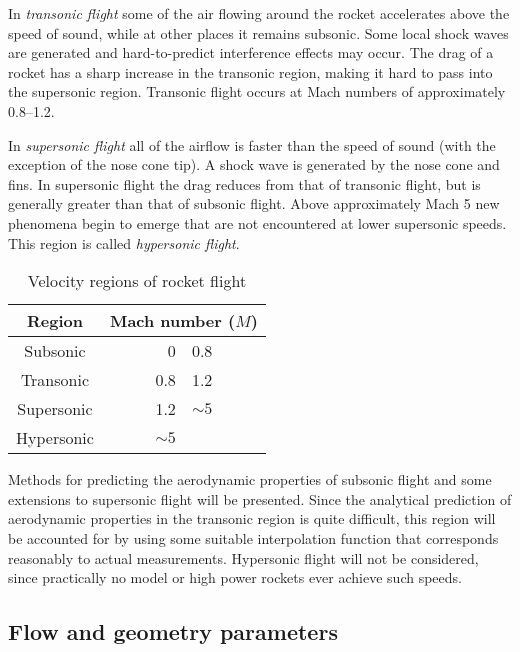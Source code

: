 In {\it transonic flight} some of the air flowing around the rocket
accelerates above the speed of sound, while at other places it remains
subsonic.  Some local shock waves are generated and hard-to-predict
interference effects may occur.  The drag of a rocket has a sharp
increase in the transonic region, making it hard to pass into the
supersonic region.  Transonic flight occurs at Mach numbers of
approximately 0.8--1.2.

In {\it supersonic flight} all of the airflow is faster than the
speed of sound (with the exception of \eg the nose cone tip).  A shock
wave is generated by the nose cone and fins.  In supersonic flight
the drag reduces from that of transonic flight, but is generally
greater than that of subsonic flight.  Above approximately Mach 5 new
phenomena begin to emerge that are not encountered at lower supersonic
speeds. This region is called {\it hypersonic flight}.

\begin{table}
\caption{Velocity regions of rocket flight}
\label{tab-sonics}
\begin{center}
\begin{tabular}{cr@{ -- }l}
Region & \multicolumn{2}{c}{Mach number ($M$)} \\
\hline
Subsonic   & \hspace{10mm} 0   & 0.8 \\
Transonic & 0.8 & 1.2 \\
Supersonic & 1.2 & $\sim5$ \\
Hypersonic & $\sim5$ & \\
\hline
\end{tabular}
\end{center}
\end{table}


Methods for predicting the aerodynamic properties of subsonic flight
and some extensions to supersonic flight will be presented.  Since the
analytical prediction of aerodynamic properties in the transonic
region is quite difficult, this region will be accounted for by using
some suitable interpolation function that corresponds reasonably to
actual measurements. Hypersonic flight will not be considered, since
practically no model or high power rockets ever achieve such speeds.


\subsection{Flow and geometry parameters}

